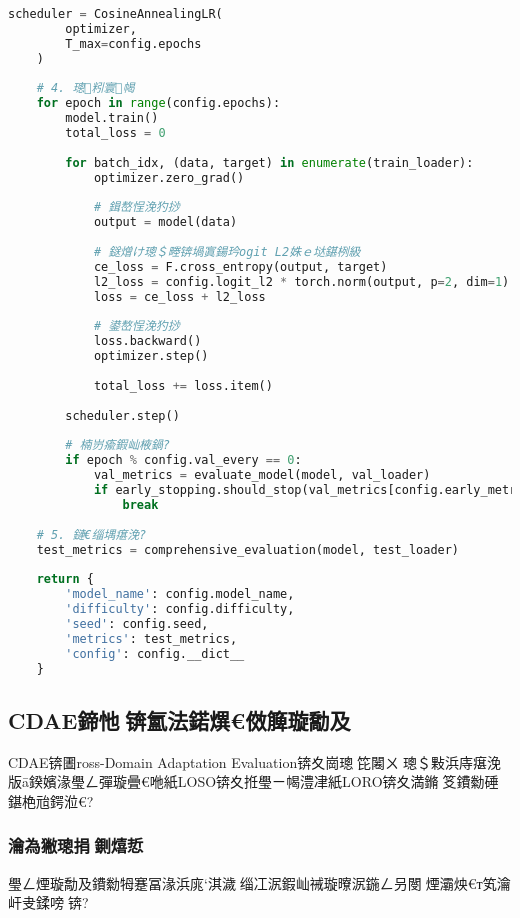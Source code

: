 {{{{{{{\begin{lstlisting}[language=Python,caption=D2鍗忚鏍稿績璁粌浠ｇ爜]
    scheduler = CosineAnnealingLR(
        optimizer, 
        T_max=config.epochs
    )
    
    # 4. 璁粌寰幆
    for epoch in range(config.epochs):
        model.train()
        total_loss = 0
        
        for batch_idx, (data, target) in enumerate(train_loader):
            optimizer.zero_grad()
            
            # 鍓嶅悜浼犳挱
            output = model(data)
            
            # 鎹熷け璁＄畻锛堝寘鍚玪ogit L2姝ｅ垯鍖栵級
            ce_loss = F.cross_entropy(output, target)
            l2_loss = config.logit_l2 * torch.norm(output, p=2, dim=1).mean()
            loss = ce_loss + l2_loss
            
            # 鍙嶅悜浼犳挱
            loss.backward()
            optimizer.step()
            
            total_loss += loss.item()
        
        scheduler.step()
        
        # 楠岃瘉鍜屾棭鍋?
        if epoch % config.val_every == 0:
            val_metrics = evaluate_model(model, val_loader)
            if early_stopping.should_stop(val_metrics[config.early_metric]):
                break
    
    # 5. 鏈€缁堣瘎浼?
    test_metrics = comprehensive_evaluation(model, test_loader)
    
    return {
        'model_name': config.model_name,
        'difficulty': config.difficulty,
        'seed': config.seed,
        'metrics': test_metrics,
        'config': config.__dict__
    }
\end{lstlisting}

\subsection{CDAE鍗忚锛氳法鍩熼€傚簲璇勪及}
\label{subsec:cdae_protocol}

CDAE锛圕ross-Domain Adaptation Evaluation锛夊崗璁笓闂ㄨ璁＄敤浜庤瘎浼版ā鍨嬪湪璺ㄥ彈璇曡€咃紙LOSO锛夊拰璺ㄧ幆澧冿紙LORO锛夊満鏅笅鐨勬硾鍖栬兘鍔涖€?

\subsubsection{瀹為獙璁捐鍘熺悊}
璺ㄥ煙璇勪及鐨勬牳蹇冨湪浜庣‘淇濊缁冮泦鍜屾祴璇曢泦鍦ㄥ叧閿煙灞炴€т笂瀹屽叏鍒嗙锛?

}}}}}}}
